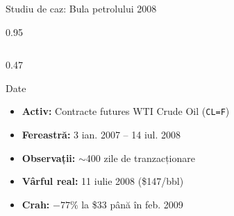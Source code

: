 \documentclass[9pt, aspectratio=169, t]{beamer}
\begin{document}
\begin{frame}{Studiu de caz: Bula petrolului 2008}
    \begin{cminipage}{0.95\textwidth}
    {\footnotesize
    \begin{columns}[T]
        \begin{column}{0.47\textwidth}
            \begin{block}{Date}
                \begin{itemize}\setlength{\itemsep}{0pt}
                    \item \textbf{Activ:} Contracte futures WTI Crude Oil (\texttt{CL=F})
                    \item \textbf{Fereastră:} 3 ian. 2007 -- 14 iul. 2008
                    \item \textbf{Observații:} $\sim$400 zile de tranzacționare
                    \item \textbf{Vârful real:} 11 iulie 2008 (\$147/bbl)
                    \item \textbf{Crah:} $-77\%$ la \$33 până în feb. 2009
                \end{itemize}
            \end{block}


\end{column}
\end{columns}}
\end{cminipage}
\end{frame}
\end{document}
